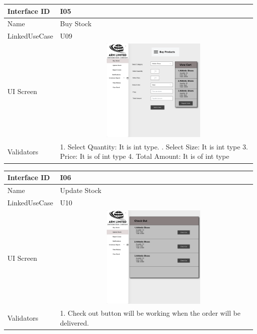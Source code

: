 \documentclass[12pt]{article}
\begin{document}
\begin{table}[H] 
\begin{tabular} {|m{6em}|m{12cm}|}
\hline
Interface ID & I05 \\ \hline
\newline
Name & Buy Stock\\ \hline
LinkedUseCase & U09 \\ \hline
UI Screen &\newline \includegraphics [width=10cm, height=5cm] {5a.png} \\ \hline
Validators &  1. Select Quantity: It is int type.
\newline
2. Select Size: It is int type
3. Price: It is of int type
4. Total Amount: It is of int type
\\ \hline
\end{tabular}
\end{table}

\begin{table}[H] 
\begin{tabular} {|m{6em}|m{12cm}|}
\hline
Interface ID & I06 \\ \hline
\newline
Name & Update Stock\\ \hline
LinkedUseCase & U10 \\ \hline
UI Screen &\newline \includegraphics [width=10cm, height=5cm] {6a.png} \\ \hline
Validators &  1. Check out button will be working when the order will be delivered.
\\ \hline
\end{tabular}
\end{table}
\end{document}
